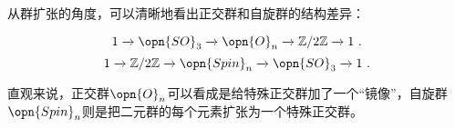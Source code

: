 \begin{example}{}
从群扩张的角度，可以清晰地看出正交群和自旋群的结构差异：

\begin{equation}
    1\xrightarrow{}\opn{SO}_3\xrightarrow{}\opn{O}_n\xrightarrow{}\mathbb{Z}/2\mathbb{Z}\xrightarrow{}1~. 
\end{equation}
\begin{equation}
    1\xrightarrow{}\mathbb{Z}/2\mathbb{Z}\xrightarrow{}\opn{Spin}_n\xrightarrow{}\opn{SO}_3\xrightarrow{}1~. 
\end{equation}

直观来说，正交群$\opn{O}_n$可以看成是给特殊正交群加了一个“镜像”，自旋群$\opn{Spin}_n$则是把二元群的每个元素扩张为一个特殊正交群。

\end{example}






























